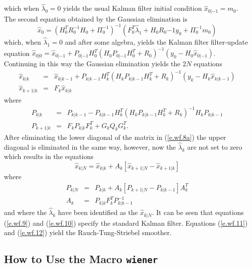 %
which when $\hat{\lambda}_0=0$ yields the usual Kalman filter initial 
condition $\hat{x}_{0|-1}=m_0$.  The second equation obtained by the
Gaussian elimination is
%
\begin{equation}
\hat{x}_0=(H_0^TR_0^{-1}H_0+\Pi_0^{-1})^{-1}(F_0^T\hat{\lambda}_1+H_0R_0{-1}y_0+\Pi_0^{-1}m_0)
\label{e.wf.8.c}
\end{equation}
%
which, when $\hat{\lambda}_1=0$ and after some algebra,
yields the Kalman filter 
filter-update equation 
$\hat{x}_{0|0}=\hat{x}_{0|-1}
+P_{0|-1}H_0^T(H_0P_{0|-1}H_0^T+R_0)^{-1}(y_0-H_0\hat{x}_{0|-1})$.
Continuing in this way  the Gaussian elimination yields the $2N$ equations
%
\begin{eqnarray}
\hat{x}_{k|k}&=&\hat{x}_{k|k-1}+P_{k|k-1}H_k^T(H_kP_{k|k-1}H_k^T+R_k)^{-1}(y_k-H_k\hat{x}_{k|k-1})\nonumber\\
\hat{x}_{k+1|k}&=&F_k\hat{x}_{k|k}
\label{e.wf.9}
\end{eqnarray}
%
where
%
\begin{eqnarray}
P_{k|k}&=&P_{k|k-1}-P_{k|k-1}H_k^T(H_kP_{k|k-1}H_k^T+R_k)^{-1}H_kP_{k|k-1}\nonumber\\
P_{k+1|k}&=&F_kP_{k|k}F_k^T+G_kQ_kG_k^T.
\label{e.wf.10}
\end{eqnarray}
%
After eliminating the lower diagonal of the matrix in (\ref{e.wf.8a})
the upper diagonal is eliminated in the same way, however, now the 
$\hat{\lambda}_k$ are not set to zero which results in the equations
%
\begin{equation}
\hat{x}_{k|N}=\hat{x}_{k|k}+A_k[\hat{x}_{k+1|N}-\hat{x}_{k+1|k}]
\label{e.wf.11}
\end{equation}
%
where
%
\begin{eqnarray}
P_{k|N}&=&P_{k|k}+A_k[P_{k+1|N}-P_{k|k-1}]A_k^T\nonumber\\
A_k&=&P_{k|k}F_k^TP_{k|k-1}^{-1}
\label{e.wf.12}
\end{eqnarray}
%
and where the $\hat{\lambda}_k$ have been identified as the $\hat{x}_{k|N}$.
It can be seen that equations (\ref{e.wf.9}) and (\ref{e.wf.10}) specify
the standard Kalman filter.  Equations (\ref{e.wf.11}) and (\ref{e.wf.12})
yield the Rauch-Tung-Striebel smoother.

\subsection{How to Use the Macro {\tt wiener}}

